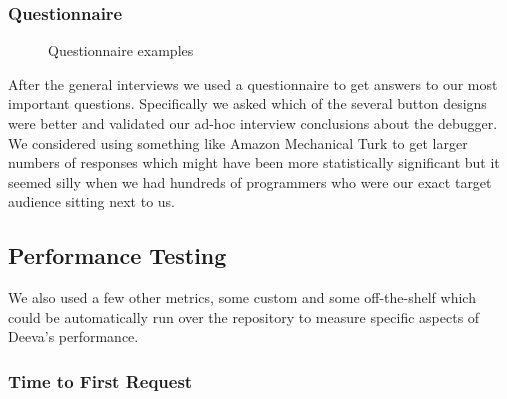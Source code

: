 \documentclass[11pt, a4paper]{article}
\begin{document}
\subsubsection{Questionnaire}
\begin{figure}[h!]
\centering
{}
\quad
{}
\caption{Questionnaire examples}
\end{figure}

After the general interviews we used a questionnaire to get answers to our most important questions.
Specifically we asked which of the several button designs were better and validated our ad-hoc interview conclusions about the debugger.
We considered using something like Amazon Mechanical Turk to get larger numbers of responses which might have been more statistically significant but it seemed silly when we had hundreds of programmers who were our exact target audience sitting next to us.


\subsection{Performance Testing}
We also used a few other metrics, some custom and some off-the-shelf which could be automatically run over the repository to measure specific aspects of Deeva’s performance.

\subsubsection{Time to First Request}
\end{document}
